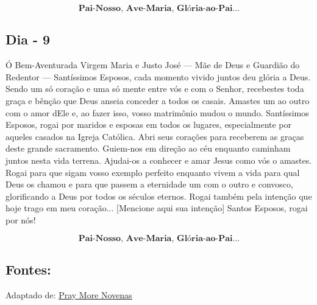\documentclass[a4paper,14pt]{extarticle} \usepackage[utf8]{inputenc}
\begin{document}
\[\textbf{Pai-Nosso, Ave-Maria, Glória-ao-Pai...}\]

\subsection{Dia - 9}

Ó Bem-Aventurada Virgem Maria e Justo José — Mãe de Deus e Guardião do Redentor — Santíssimos Esposos, cada momento vivido juntos deu glória a Deus.
Sendo um só coração e uma só mente entre vós e com o Senhor, recebestes toda graça e bênção que Deus anseia conceder a todos os casais. Amastes um ao outro com o amor dEle e, ao fazer isso, vosso matrimônio mudou o mundo.
Santíssimos Esposos, rogai por maridos e esposas em todos os lugares, especialmente por aqueles casados na Igreja Católica. Abri seus corações para receberem as graças deste grande sacramento. Guiem-nos em direção ao céu enquanto caminham juntos nesta vida terrena. Ajudai-os a conhecer e amar Jesus como vós o amastes. Rogai para que sigam vosso exemplo perfeito enquanto vivem a vida para qual Deus os chamou e para que passem a eternidade um com o outro e convosco, glorificando a Deus por todos os séculos eternos.
Rogai também pela intenção que hoje trago em meu coração... [Mencione aqui sua intenção] Santos Esposos, rogai por nós!

\[\textbf{Pai-Nosso, Ave-Maria, Glória-ao-Pai...}\]

\vfill

\begin{center}
\subsection*{Fontes:}
Adaptado de: {\color{blue} \underline{\href{https://www.praymorenovenas.com/holy-spouses-novena}{Pray More Novenas}}}
\end{center}
\end{document}
